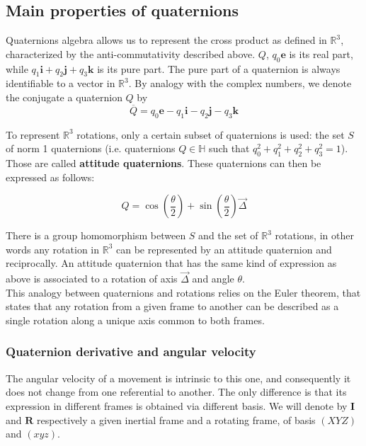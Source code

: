\documentclass{article}
\begin{document}
\subsection{Main properties of quaternions}

Quaternions algebra allows us to represent the cross product as defined in $\mathbb{R}^3$, characterized by the anti-commutativity described above. $Q$, $q_0\textbf{e}$ is its real part, while $q_1\textbf{i} + q_2\textbf{j} + q_3\textbf{k}$ is its pure part. The pure part of a quaternion is always identifiable to a vector in  $\mathbb{R}^3$. By analogy with the complex numbers, we denote the conjugate a quaternion $Q$ by
\[ \overline{Q} = q_0\textbf{e} - q_1\textbf{i} - q_2\textbf{j} - q_3\textbf{k}
\]

To represent $\mathbb{R}^3$ rotations, only a certain subset of quaternions is used: the set $S$ of norm 1 quaternions (i.e. quaternions $Q \in \mathbb{H}$ such that $q_0^2 + q_1^2 + q_2^2 + q_3^2 = 1$). Those are called \textbf{attitude quaternions}.
These quaternions can then be expressed as follows:

\begin{equation} Q = \cos\left(\frac{\theta}{2}\right) + \sin\left(\frac{\theta}{2}\right)\vec{\Delta}
\end{equation}

There is a group homomorphism between $S$ and the set of $\mathbb{R}^3$ rotations, in other words any rotation in $\mathbb{R}^3$ can be represented by an attitude quaternion and reciprocally. An attitude quaternion that has the same kind of expression as above is associated to a rotation of axis $\vec{\Delta}$ and angle $\theta$. \\
This analogy between quaternions and rotations relies on the Euler theorem, that states \cite{ADC} that any rotation from a given frame to another can be described as a single rotation along a unique axis common to both frames. \\

\subsubsection{Quaternion derivative and angular velocity}

The angular velocity of a movement is intrinsic to this one, and consequently it does not change from one referential to another. The only difference is that its expression in different frames is obtained via different basis. We will denote by $\bm{I}$ and $\bm{R}$ respectively a given inertial frame and a rotating frame, of basis $(XYZ)$ and $(xyz)$.
\end{document}
